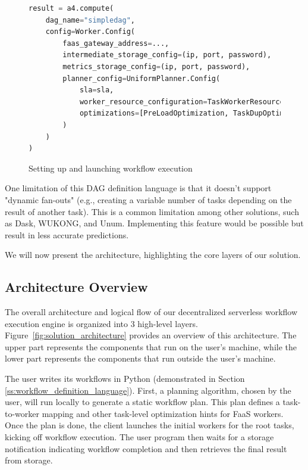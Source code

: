 \documentclass[conference]{IEEEtran}
\begin{document}
\begin{figure}[h]
\centering
\begin{lstlisting}[language=Python, basicstyle=\ttfamily\footnotesize, columns=fullflexible, breaklines=true]
result = a4.compute(
    dag_name="simpledag", 
    config=Worker.Config(
        faas_gateway_address=...,
        intermediate_storage_config=(ip, port, password),
        metrics_storage_config=(ip, port, password),
        planner_config=UniformPlanner.Config(
            sla=sla,
            worker_resource_configuration=TaskWorkerResourceConfiguration(cpus=3, memory_mb=512),
            optimizations=[PreLoadOptimization, TaskDupOptimization]
        )
    )
)
\end{lstlisting}
\caption{Setting up and launching workflow execution}
\label{lst:setup_and_launch_workflow_execution}
\end{figure}

One limitation of this DAG definition language is that it doesn't support "dynamic fan-outs" (e.g., creating a variable number of tasks depending on the result of another task). This is a common limitation among other solutions, such as Dask, WUKONG, and Unum. Implementing this feature would be possible but result in less accurate predictions.

We will now present the architecture, highlighting the core layers of our solution.

\subsection{Architecture Overview}

The overall architecture and logical flow of our decentralized serverless workflow execution engine is organized into 3 high-level layers. Figure~\ref{fig:solution_architecture} provides an overview of this architecture. The upper part represents the components that run on the user's machine, while the lower part represents the components that run outside the user's machine. 

The user writes its workflows in Python (demonstrated in Section \ref{ss:workflow_definition_language}). First, a planning algorithm, chosen by the user, will run locally to generate a static workflow plan. This plan defines a task-to-worker mapping and other task-level optimization hints for FaaS workers. Once the plan is done, the client launches the initial workers for the root tasks, kicking off workflow execution. The user program then waits for a storage notification indicating workflow completion and then retrieves the final result from storage.
\end{document}
